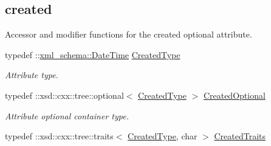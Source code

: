 \subsection*{created}
\label{_amgrpe2fa538867c3830a859a5b17ab24644b}
Accessor and modifier functions for the created optional attribute. \begin{DoxyCompactItemize}
\item 
\hypertarget{classopenstack_1_1xml_1_1Image_a360d670b5a84c270cdb344dad1f59e56}{
typedef ::\hyperlink{namespacexml__schema_ac157d7debe19af40c06ef2330429a088}{xml\_\-schema::DateTime} \hyperlink{classopenstack_1_1xml_1_1Image_a360d670b5a84c270cdb344dad1f59e56}{CreatedType}}
\label{classopenstack_1_1xml_1_1Image_a360d670b5a84c270cdb344dad1f59e56}

\begin{DoxyCompactList}\small\item\em Attribute type. \item\end{DoxyCompactList}\item 
\hypertarget{classopenstack_1_1xml_1_1Image_a532e06bfeaea36645262e3deb23899b1}{
typedef ::xsd::cxx::tree::optional$<$ \hyperlink{classopenstack_1_1xml_1_1Image_a360d670b5a84c270cdb344dad1f59e56}{CreatedType} $>$ \hyperlink{classopenstack_1_1xml_1_1Image_a532e06bfeaea36645262e3deb23899b1}{CreatedOptional}}
\label{classopenstack_1_1xml_1_1Image_a532e06bfeaea36645262e3deb23899b1}

\begin{DoxyCompactList}\small\item\em Attribute optional container type. \item\end{DoxyCompactList}\item 
\hypertarget{classopenstack_1_1xml_1_1Image_aa343a933c99cc5a977a0d430ac502daa}{
typedef ::xsd::cxx::tree::traits$<$ \hyperlink{classopenstack_1_1xml_1_1Image_a360d670b5a84c270cdb344dad1f59e56}{CreatedType}, char $>$ \hyperlink{classopenstack_1_1xml_1_1Image_aa343a933c99cc5a977a0d430ac502daa}{CreatedTraits}}
\label{classopenstack_1_1xml_1_1Image_aa343a933c99cc5a977a0d430ac502daa}


\end{DoxyCompactItemize}
